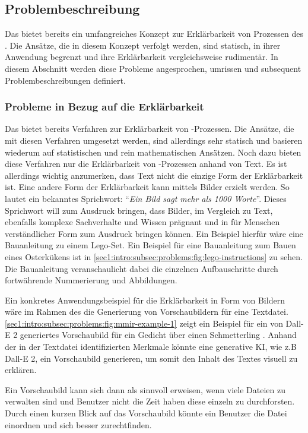 \subsection{Problembeschreibung}
\label{sec1:intro:subsec:problems}
Das \gmaf{} bietet bereits ein umfangreiches Konzept zur Erklärbarkeit von Prozessen des \mmir{}.
Die Ansätze, die in diesem Konzept verfolgt werden, sind statisch, in ihrer Anwendung begrenzt und ihre Erklärbarkeit vergleichsweise rudimentär.
In diesem Abschnitt werden diese Probleme angesprochen, umrissen und subsequent Problembeschreibungen definiert.

\subsubsection{Probleme in Bezug auf die Erklärbarkeit}
\label{sec1:intro:subsec:problems:pb:explain}
Das \gmaf{} bietet bereits Verfahren zur Erklärbarkeit von \mmir{}-Prozessen.
Die Ansätze, die mit diesen Verfahren umgesetzt werden, sind allerdings sehr statisch und basieren wiederum auf statistischen und rein mathematischen Ansätzen.
Noch dazu bieten diese Verfahren nur die Erklärbarkeit von \mmir{}-Prozessen anhand von Text.
Es ist allerdings wichtig anzumerken, dass Text nicht die einzige Form der Erklärbarkeit ist.
Eine andere Form der Erklärbarkeit kann mittels Bilder erzielt werden.
So lautet ein bekanntes Sprichwort: \enquote{\textit{Ein Bild sagt mehr als 1000 Worte}}.
Dieses Sprichwort will zum Ausdruck bringen, dass Bilder, im Vergleich zu Text, ebenfalls komplexe Sachverhalte und Wissen prägnant und in für Menschen verständlicher Form zum Ausdruck bringen können.
Ein Beispiel hierfür wäre eine Bauanleitung zu einem Lego-Set.
Ein Beispiel für eine Bauanleitung zum Bauen eines Osterkükens ist in \cref{sec1:intro:subsec:problems:fig:lego-instructions} zu sehen.
Die Bauanleitung veranschaulicht dabei die einzelnen Aufbauschritte durch fortwährende Nummerierung und Abbildungen.


Ein konkretes Anwendungsbeispiel für die Erklärbarkeit in Form von Bildern wäre im Rahmen des \mmir{} die Generierung von Vorschaubildern für eine Textdatei.
\cref{sec1:intro:subsec:problems:fig:mmir-example-1} zeigt ein Beispiel für ein von Dall-E 2 \cite{dall-e-2} generiertes Vorschaubild für ein Gedicht über einen Schmetterling \cite{butterfly-poem}.
Anhand der in der Textdatei identifizierten Merkmale könnte eine generative KI, wie z.B Dall-E 2, ein Vorschaubild generieren, um somit den Inhalt des Textes visuell zu erklären.

Ein Vorschaubild kann sich dann als sinnvoll erweisen, wenn viele Dateien zu verwalten sind und Benutzer nicht die Zeit haben diese einzeln zu durchforsten.
Durch einen kurzen Blick auf das Vorschaubild könnte ein Benutzer die Datei einordnen und sich besser zurechtfinden.

